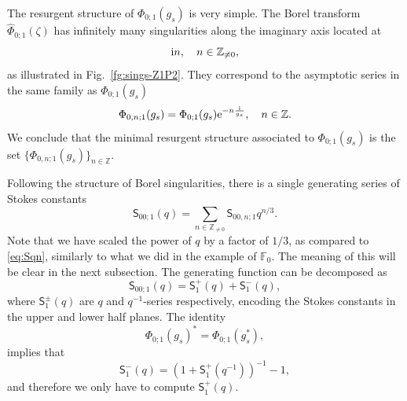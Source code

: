 \documentclass[a4paper,11pt]{article}
\theoremstyle{definition}
\def\IZ{{\mathbb Z}}
\def\IF{{\mathbb F}}
\newcommand{\re}{{\rm e}}
\newcommand{\ri}{{\rm i}}
\newcommand{\wh}[1]{\widehat{#1}}
\def\ms{\mathsf}
\begin{document}
The resurgent structure of $\Phi_{0;1}(g_s)$ is very simple. The Borel transform $\wh{\Phi}_{0;1}(\zeta)$ has
infinitely many singularities along the imaginary axis located at
\begin{equation}
  \ri n, \quad n\in\IZ_{\neq 0},
  \label{eq:sings-Z1P2}
\end{equation}
as illustrated in Fig.~\ref{fg:sings-Z1P2}.  They correspond to the
asymptotic series in the same family as $\Phi_{0;1}(g_s)$
\begin{equation}
  \Phi_{0,n;1}(g_s) = \Phi_{0;1}(g_s)\re^{-n\frac{\ri}{g_s}},\quad
  n\in\IZ.
  \label{eq:Phi0nN1-P2}
\end{equation}
%
We conclude that the minimal resurgent structure associated to $ \Phi_{0;1}(g_s)$ is the set $\{  \Phi_{0,n;1}(g_s) \}_{n \in \IZ} $. 

Following the structure of Borel singularities, there is a single
generating series of Stokes constants
\begin{equation}
  \ms{S}_{00;1}(q) = \sum_{n\in\IZ_{\neq 0}} \ms{S}_{00,n;1}q^{n/3}.
\end{equation}
%
Note that we have scaled the power of $q$ by a factor of $1/3$, as compared to
\eqref{eq:Sqn}, similarly to what we did in the example of $\IF_0$. The meaning of this 
will be clear in the next subsection. The generating
function can be decomposed as
\begin{equation}
  \ms{S}_{00;1}(q) = \ms{S}_{1}^+(q) + \ms{S}_{1}^-(q),
\end{equation}
where $\ms{S}_{1}^{\pm}(q)$ are $q$ and $q^{-1}$-series respectively,
encoding the Stokes constants in the upper and lower half planes.  The
identity
\begin{equation}
  \Phi_{0;1}(g_s)^* = \Phi_{0;1}(g_s^*),
\end{equation}
implies that
\begin{equation}
  \ms{S}_1^-(q) = (1+\ms{S}_1^+(q^{-1}))^{-1}-1,
  \label{eq:SnZ1P2}
\end{equation}
and therefore we only have to compute $\ms{S}_1^+(q)$.
\end{document}
